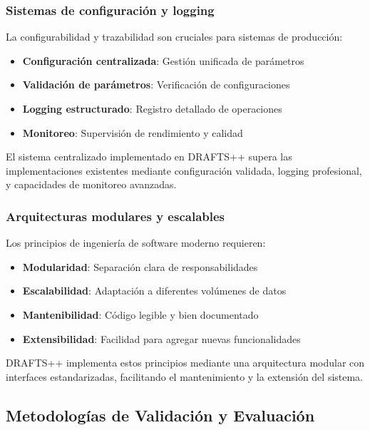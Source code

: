 \subsubsection{Sistemas de configuración y logging}

La configurabilidad y trazabilidad son cruciales para sistemas de producción:

\begin{itemize}
    \item \textbf{Configuración centralizada}: Gestión unificada de parámetros
    \item \textbf{Validación de parámetros}: Verificación de configuraciones
    \item \textbf{Logging estructurado}: Registro detallado de operaciones
    \item \textbf{Monitoreo}: Supervisión de rendimiento y calidad
\end{itemize}

El sistema centralizado implementado en DRAFTS++ supera las implementaciones existentes mediante configuración validada, logging profesional, y capacidades de monitoreo avanzadas.

\subsubsection{Arquitecturas modulares y escalables}

Los principios de ingeniería de software moderno requieren:

\begin{itemize}
    \item \textbf{Modularidad}: Separación clara de responsabilidades
    \item \textbf{Escalabilidad}: Adaptación a diferentes volúmenes de datos
    \item \textbf{Mantenibilidad}: Código legible y bien documentado
    \item \textbf{Extensibilidad}: Facilidad para agregar nuevas funcionalidades
\end{itemize}

DRAFTS++ implementa estos principios mediante una arquitectura modular con interfaces estandarizadas, facilitando el mantenimiento y la extensión del sistema.

\subsection{Metodologías de Validación y Evaluación}

